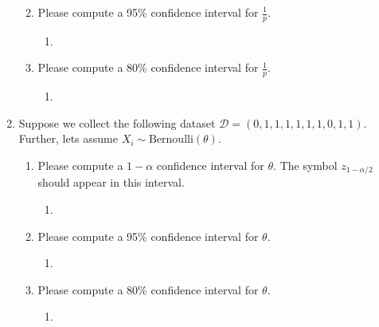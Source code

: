 \documentclass[krantz1,ChapterTOCs]{krantz}
\begin{document}
\begin{enumerate}
\begin{enumerate}
\begin{enumerate}
{                     } 
            \end{enumerate}

            \item Please compute a 95\% confidence interval for $\frac{1}{p}$.
        \begin{enumerate}
            \item {
            \color{red} 
        
            } 
        \end{enumerate}

            \item Please compute a 80\% confidence interval for $\frac{1}{p}$.
        \begin{enumerate}
            \item {
            \color{red} 
        
            } 
        \end{enumerate}

        \end{enumerate}
        
    \item Suppose we collect the following dataset $\mathcal{D} = (0, 1, 1, 1, 1, 1, 1, 0, 1, 1)$. Further, lets assume $X_{i} \sim \text{Bernoulli}(\theta)$.
        \begin{enumerate}
            \item Please compute a $1-\alpha$ confidence interval for $\theta$. The symbol $z_{1-\alpha/2}$ should appear in this interval. 
        \begin{enumerate}
            \item {
            \color{red} 
        
            } 
        \end{enumerate}

            \item Please compute a 95\% confidence interval for $\theta$.
        \begin{enumerate}
            \item {
            \color{red} 
        
            } 
        \end{enumerate}

            \item Please compute a 80\% confidence interval for $\theta$.
        \begin{enumerate}
            \item {
            \color{red} 
        
}
\end{enumerate}
\end{enumerate}
\end{enumerate}
\end{document}
